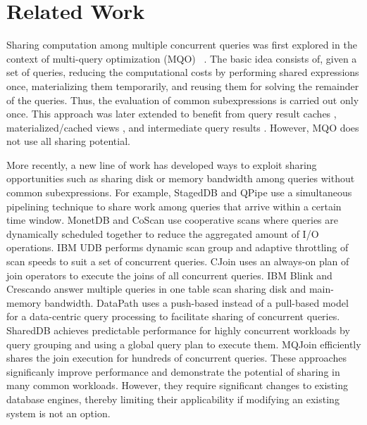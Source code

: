 \section{Related Work}
\label{sec:rel-work}

Sharing computation among multiple concurrent queries was first explored in the
context of multi-query optimization (MQO)%
~\cite{Finkelstein:1982:CEA:582353.582400,Sellis:1988:MO:42201.42203}. The basic
idea consists of, given a set of queries, reducing the computational costs by performing 
shared expressions once, materializing them temporarily, and reusing them for solving the remainder of the queries.
Thus, the evaluation of common subexpressions 
is carried out only once. This approach was later
extended to benefit from query result caches \cite{qrc}, materialized/cached
views \cite{mcv}, and intermediate query results \cite{iqr1, iqr2}. However,
MQO does not use all
sharing potential.

More recently, a new line of work has developed ways to exploit sharing
opportunities such as sharing disk or memory bandwidth among queries without
common subexpressions.  For example, StagedDB \cite{stageddb} and QPipe
\cite{Harizopoulos:2005:QSP:1066157.1066201} use a simultaneous pipelining
technique to share work among queries that arrive within a certain time window.
MonetDB \cite{Zukowski:2007:CSD:1325851.1325934} and CoScan \cite{CoScan2011}
use cooperative scans where queries are dynamically scheduled together to
reduce the aggregated amount of I/O operations.  IBM UDB
\cite{Lang:2007:IBM:1325851.1325999} performs dynamic scan group and adaptive
throttling of scan speeds to suit a set of concurrent queries. CJoin
\cite{Candea:2009:SPJ:1687627.1687659} uses an always-on plan of join operators
to execute the joins of all concurrent queries. IBM Blink
\cite{Raman:2008:CQP:1546682.1547130} and Crescando
\cite{Giannikis:2010:CRE:1807167.1807326} answer multiple queries in one table
scan sharing disk and main-memory bandwidth. Data\-Path
\cite{Arumugam:2010:DSD:1807167.1807224} uses a push-based instead of a
pull-based model for a data-centric query processing to facilitate sharing of
concurrent queries.  SharedDB \cite{Giannikis:2012:SKO:2168651.2168654}
achieves predictable performance for highly concurrent workloads by query
grouping and using a global query plan to execute them.  MQJoin \cite{mqjoin}
efficiently shares the join execution for hundreds of concurrent queries.
These approaches significanly improve performance and demonstrate the potential
of sharing in many common workloads. However, they require significant changes
to existing database engines, thereby limiting their applicability
if modifying an existing system is not an option.  


